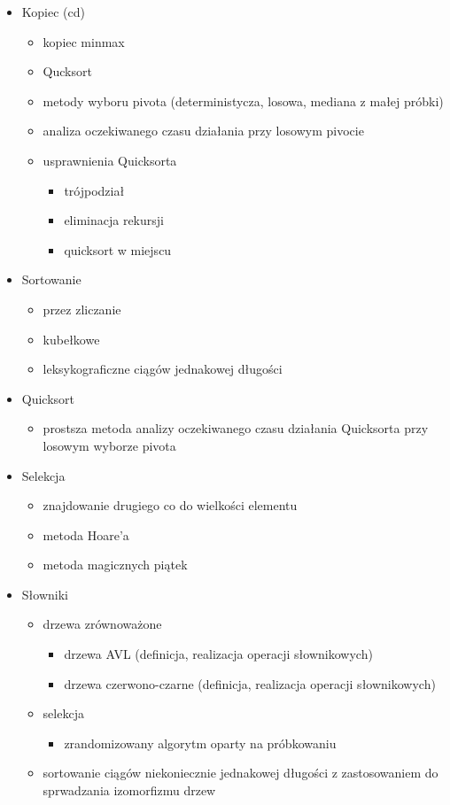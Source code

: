 \documentclass[svgnames]{report}
\begin{document}
\begin{itemize}
\item Kopiec (cd)
\begin{itemize}
	\item kopiec minmax
	\item Qucksort
	\item metody wyboru pivota (deterministycza, losowa, mediana z małej próbki)
	\item analiza oczekiwanego czasu działania przy losowym pivocie
	\item usprawnienia Quicksorta
	\begin{itemize}
		\item trójpodział
		\item eliminacja rekursji
		\item quicksort w miejscu
	\end{itemize}
\end{itemize}

\item Sortowanie
\begin{itemize}
	\item przez zliczanie
	\item kubełkowe
	\item leksykograficzne ciągów jednakowej długości
\end{itemize}

\item Quicksort
\begin{itemize}
	\item prostsza metoda analizy oczekiwanego czasu działania Quicksorta przy losowym wyborze pivota
\end{itemize}

\item Selekcja
\begin{itemize}
	\item znajdowanie drugiego co do wielkości elementu
	\item metoda Hoare'a
	\item metoda magicznych piątek
\end{itemize}

\item Słowniki
\begin{itemize}
	\item drzewa zrównoważone
	\begin{itemize}
		\item drzewa AVL (definicja, realizacja operacji słownikowych)
		\item drzewa czerwono-czarne (definicja, realizacja operacji słownikowych)
	\end{itemize}
	\item selekcja
	\begin{itemize}
		\item zrandomizowany algorytm oparty na próbkowaniu
	\end{itemize}
	\item sortowanie ciągów niekoniecznie jednakowej długości z zastosowaniem do sprwadzania izomorfizmu drzew
\end{itemize}


\end{itemize}
\end{document}
